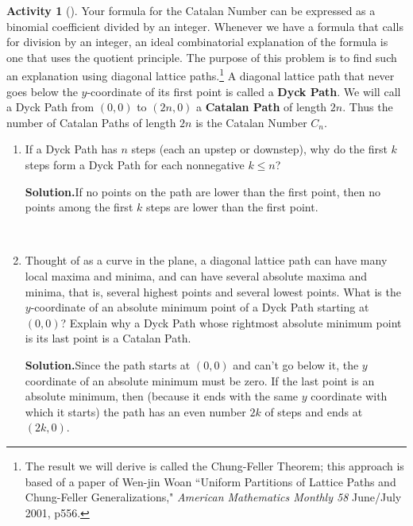 \documentclass[10pt,]{book}
\newcommand{\terminology}[1]{\textbf{#1}}
\theoremstyle{plain}
\theoremstyle{definition}
\newtheorem{activity}[project]{Activity}
\numberwithin{equation}{chapter}
\begin{document}
\begin{activity}[]\label{activity-52}
Your formula for the Catalan Number can be expressed as a binomial coefficient divided by an integer. Whenever we have a formula that calls for division by an integer, an ideal combinatorial explanation of the formula is one that uses the quotient principle. The purpose of this problem is to find such an explanation using diagonal lattice paths.\footnote{The result we will derive is called the Chung-Feller Theorem; this approach is based of a paper of Wen-jin Woan ``Uniform Partitions of Lattice Paths and Chung-Feller Generalizations," \textsl{American Mathematics Monthly 58} June/July 2001, p556.\label{fn-3}} A diagonal lattice path that never goes below the \(y\)-coordinate of its first point is called a \terminology{Dyck Path}. We will call a Dyck Path from \((0,0)\) to \((2n,0)\) a \terminology{Catalan Path} of length \(2n\). Thus the number of Catalan Paths of length \(2n\) is the Catalan Number \(C_n\).%
~\par
\begin{enumerate}[label=(\alph*)]
 \item If a Dyck Path has \(n\) steps (each an upstep or downstep), why do the first \(k\) steps form a Dyck Path for each nonnegative \(k\le n\)?%
\par\medskip\noindent%
\textbf{Solution.}\quad If no points on the path are lower than the first point, then no points among the first \(k\) steps are lower than the first point.%

~\par
\item Thought of as a curve in the plane, a diagonal lattice path can have many local maxima and minima, and can have several absolute maxima and minima, that is, several highest points and several lowest points. What is the \(y\)-coordinate of an absolute minimum point of a Dyck Path starting at \((0,0)\)?  Explain why a Dyck Path whose rightmost absolute minimum point is its last point is a Catalan Path.%
\par\medskip\noindent%
\textbf{Solution.}\quad Since the path starts at \((0,0)\) and can't go below it, the \(y\) coordinate of an absolute minimum must be zero. If the last point is an absolute minimum, then (because it ends with the same \(y\) coordinate with which it starts) the path has an even number \(2k\) of steps and ends at \((2k,0)\).%


\end{enumerate}
\end{activity}
\end{document}
